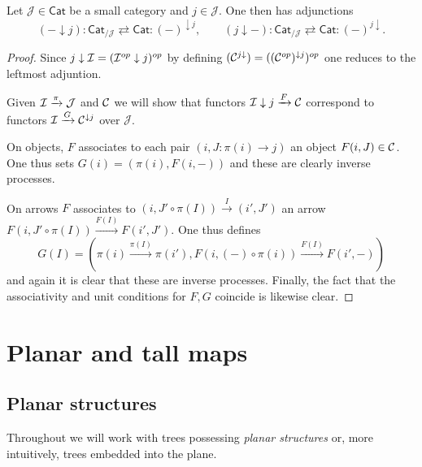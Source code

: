 \documentclass[a4paper,10pt]{article}%
\begin{document}
	

\begin{lemma}\label{UNDERLEFTADJ LEM}
Let $\mathcal{J} \in \mathsf{Cat}$ be a small category and 
$j \in \mathcal{J}$. One then has adjunctions
\[
	(\minus \downarrow j) 
		\colon
	\mathsf{Cat}_{/\mathcal{J}}
		\rightleftarrows
	\mathsf{Cat}
		\colon
	(\minus)^{\downarrow j},
\qquad
	(j \downarrow \minus) 
		\colon
	\mathsf{Cat}_{/\mathcal{J}}
		\rightleftarrows
	\mathsf{Cat}
		\colon
	(\minus)^{j \downarrow}.
\]
\end{lemma}

\begin{proof}
Since $j \downarrow \mathcal{I} = (\mathcal{I}^{op} \downarrow j)^{op}$ by  defining $(\mathcal{C}^{j \downarrow}) = ((\mathcal{C}^{op})^{\downarrow j})^{op}$ one reduces to the leftmost adjuntion.

	Given $\mathcal{I} \xrightarrow{\pi} \mathcal{J}$ and $\mathcal{C}$ we will show that functors 
	$\mathcal{I} \downarrow j \xrightarrow{F} \mathcal{C}$
correspond to functors
	$\mathcal{I} \xrightarrow{G} \mathcal{C}^{\downarrow j}$ over $\mathcal{J}$.
	
	On objects, $F$ associates to each pair 
	$(i,J\colon \pi(i) \to j)$ an object $F(i,J)\in \mathcal{C}$. One thus sets $G(i)=(\pi(i), F(i,\minus))$ and these are clearly inverse processes.

	On arrows $F$ associates to 
	$(i,J' \circ \pi(I)) \xrightarrow{I} (i',J')$ an arrow
	$F(i,J' \circ \pi(I)) \xrightarrow{F(I)} F(i',J')$.
	One thus defines
\[
	G(I) = \left(
	\pi(i) \xrightarrow{\pi(I)} \pi(i'),
	F\left(i,(\minus)\circ \pi(i)\right)
		\xrightarrow{F(I)}
	F\left(i',\minus \right)
	\right)
\]
and again it is clear that these are inverse processes.
	Finally, the fact that the associativity and unit conditions for $F,G$ coincide is likewise clear.
\end{proof}







\section{Planar and tall maps}

\subsection{Planar structures}


Throughout we will work with trees possessing \textit{planar structures} or, more intuitively, trees embedded into the plane.
\end{document}
